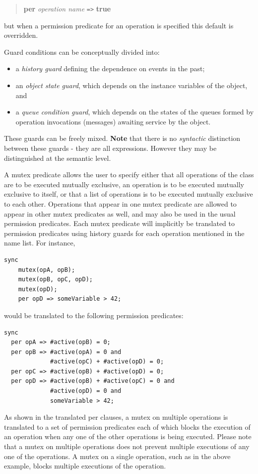 \documentclass{overturerepchap}
\newcommand{\keyw}[1]{{\bf\ttfamily #1}}
\begin{document}
{\begin{description}
\begin{quote}
{\keyw{per}} {\em operation name} \texttt{=>} \keyw{true}
\end{quote}

but when a permission predicate for an operation is specified
this default is overridden.

Guard conditions can be conceptually divided into:
\begin{itemize}
\item
a {\em history guard} defining the dependence on events in the past;
\item
an {\em object state guard}, which depends on the instance variables of the
object, and
\item
a {\em queue condition guard}, which depends on the
states of the queues formed by operation invocations (messages) awaiting
service by the object.
\end{itemize}
These guards can be freely mixed. \textbf{Note} that there is no
\textit{syntactic} distinction between these guards - they are all
expressions. However they may be distinguished at the semantic level.

A mutex predicate allows the user to specify either that all operations of the 
class are to be executed mutually exclusive, an operation is to be executed 
mutually exclusive to itself, or that a list of operations is to be executed mutually 
exclusive to each other.
Operations that appear in one mutex predicate are allowed to
appear in other mutex predicates as well, and may also be used in the
usual permission predicates. Each mutex predicate will implicitly be
translated to permission predicates using history guards for each
operation mentioned in the name list. For instance,
\begin{lstlisting}
sync
    mutex(opA, opB);
    mutex(opB, opC, opD);
    mutex(opD);
    per opD => someVariable > 42;
\end{lstlisting}
would be translated to the following permission predicates:
\begin{lstlisting}
sync
  per opA => #active(opB) = 0;
  per opB => #active(opA) = 0 and
             #active(opC) + #active(opD) = 0;
  per opC => #active(opB) + #active(opD) = 0;
  per opD => #active(opB) + #active(opC) = 0 and
             #active(opD) = 0 and
             someVariable > 42;
\end{lstlisting}

As shown in the translated per clauses, a mutex on multiple operations is 
translated to a set of permission predicates each of which blocks the execution 
of an operation when any one of the other operations is being executed. 
Please note that a mutex on multiple operations does not prevent multiple executions 
of any one of the operations. A mutex on a single operation, such as {\bf{}}
in the above example, blocks multiple executions of the operation.


\end{description}}
\end{document}
